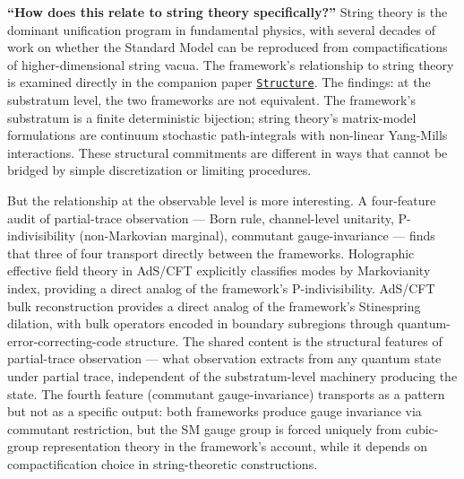 \documentclass[
]{article}
\begin{document}
\textbf{``How does this relate to string theory specifically?''} String
theory is the dominant unification program in fundamental physics, with
several decades of work on whether the Standard Model can be reproduced
from compactifications of higher-dimensional string vacua. The
framework's relationship to string theory is examined directly in the
companion paper \href{Structure.md}{\texttt{Structure}}. The findings:
at the substratum level, the two frameworks are not equivalent. The
framework's substratum is a finite deterministic bijection; string
theory's matrix-model formulations are continuum stochastic
path-integrals with non-linear Yang-Mills interactions. These structural
commitments are different in ways that cannot be bridged by simple
discretization or limiting procedures.

But the relationship at the observable level is more interesting. A
four-feature audit of partial-trace observation --- Born rule,
channel-level unitarity, P-indivisibility (non-Markovian marginal),
commutant gauge-invariance --- finds that three of four transport
directly between the frameworks. Holographic effective field theory in
AdS/CFT explicitly classifies modes by Markovianity index, providing a
direct analog of the framework's P-indivisibility. AdS/CFT bulk
reconstruction provides a direct analog of the framework's Stinespring
dilation, with bulk operators encoded in boundary subregions through
quantum-error-correcting-code structure. The shared content is the
structural features of partial-trace observation --- what observation
extracts from any quantum state under partial trace, independent of the
substratum-level machinery producing the state. The fourth feature
(commutant gauge-invariance) transports as a pattern but not as a
specific output: both frameworks produce gauge invariance via commutant
restriction, but the SM gauge group is forced uniquely from cubic-group
representation theory in the framework's account, while it depends on
compactification choice in string-theoretic constructions.
\end{document}
